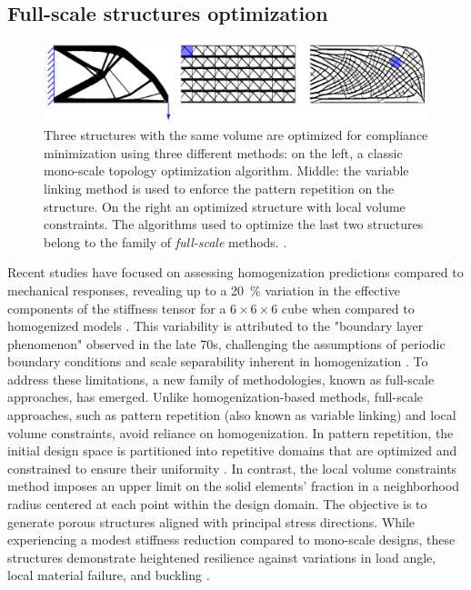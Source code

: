 \subsection{Full-scale structures optimization}
\begin{figure}
    \centering
    \includegraphics[width=0.8\linewidth]{figures/02_literature/full-to.png}
    \caption{Three structures with the same volume are optimized for compliance minimization using three different methods: on the left, a classic mono-scale topology optimization algorithm. Middle: the variable linking method is used to enforce the pattern repetition on the structure. On the right an optimized structure with local volume constraints. The algorithms used to optimize the last two structures belong to the family of \textit{full-scale} methods. \cite{wu_topology_2021}.}
    \label{fig:02_full-to}
\end{figure}

Recent studies have focused on assessing homogenization predictions compared to mechanical responses, revealing up to a \qty{20}{\percent} variation in the effective components of the stiffness tensor for a $6\times6\times6$ cube when compared to homogenized models . This variability is attributed to the "boundary layer phenomenon" observed in the late 70s, challenging the assumptions of periodic boundary conditions and scale separability inherent in homogenization . To address these limitations, a new family of methodologies, known as full-scale approaches, has emerged. Unlike homogenization-based methods, full-scale approaches, such as pattern repetition (also known as variable linking) and local volume constraints, avoid reliance on homogenization. In pattern repetition, the initial design space is partitioned into repetitive domains that are optimized and constrained to ensure their uniformity . In contrast, the local volume constraints method imposes an upper limit on the solid elements' fraction in a neighborhood radius centered at each point within the design domain. The objective is to generate porous structures aligned with principal stress directions. While experiencing a modest stiffness reduction compared to mono-scale designs, these structures demonstrate heightened resilience against variations in load angle, local material failure, and buckling .

